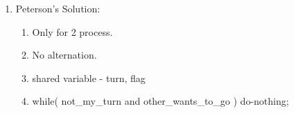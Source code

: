 \begin{enumerate}
  \item Peterson's Solution:
  \begin{enumerate}
    \item Only for 2 process.
    \item No alternation.
    \item shared variable - turn, flag
    \item while( not\_my\_turn and other\_wants\_to\_go ) do-nothing;
  \end{enumerate}
      \begin{myTableStyle}
        \begin{tabular}{ |m{6cm}|m{6cm}| } \hline
               &      \\ \hline
        \end{tabular}
      \end{myTableStyle}
      \vspace{0.08in}

\end{enumerate}








